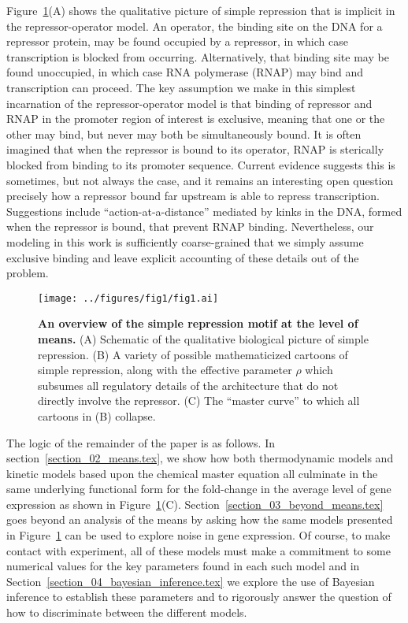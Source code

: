 Figure~\ref{fig1:means_cartoons}(A) shows the qualitative picture of simple repression that
is implicit in the repressor-operator model.
An operator, the binding site on the DNA for a repressor protein, may be found
occupied by a repressor, in which case transcription is blocked from occurring.
Alternatively, that binding site may be found unoccupied, in which case RNA polymerase (RNAP) may bind and
transcription can proceed.
The key assumption we make in this simplest incarnation of
the repressor-operator model is that binding of repressor and RNAP in the promoter
region of interest is exclusive, meaning that one or the other may bind, but
never may both be simultaneously bound. It is often imagined that when the
repressor is bound to its operator, RNAP is sterically blocked from binding to
its promoter sequence. Current evidence suggests this is sometimes, but not
always the case, and it remains
an interesting open question precisely how a repressor bound far upstream is
able to repress transcription. 
Suggestions include ``action-at-a-distance''
mediated by kinks in the DNA, formed when the repressor is bound, that prevent
RNAP binding. Nevertheless, our modeling in this work is sufficiently
coarse-grained that we simply assume exclusive binding and leave explicit accounting
of these details out of the problem.

\begin{figure}%
\centering
\texttt{[image: ../figures/fig1/fig1.ai]}
\caption{\textbf{An overview of the simple repression motif at the level of
means.} (A) Schematic of the qualitative biological picture of simple repression. (B)
A variety of possible mathematicized cartoons of simple repression, along
with the effective parameter $\rho$ which subsumes all regulatory details of the
architecture that do not directly involve the repressor. (C) The ``master curve'' to which
all cartoons in (B) collapse.}
\label{fig1:means_cartoons}
\end{figure}

The logic of the remainder of the paper is as follows.
In section~\ref{section_02_means.tex}, we show how
both thermodynamic models and kinetic models based upon
the chemical master equation all culminate in the same underlying
functional form for the fold-change in the average level of gene
expression as shown in Figure~\ref{fig1:means_cartoons}(C).  Section~\ref{section_03_beyond_means.tex} goes
beyond an analysis of the means by asking how the same models
presented in Figure~\ref{fig1:means_cartoons} can be used
to explore noise in gene expression. Of course, to make contact
with experiment, all of these models must make a commitment
to some numerical values for the key parameters found in each
such model and in Section~\ref{section_04_bayesian_inference.tex}
we explore the use of Bayesian inference to establish
these parameters and to rigorously answer the question of how
to discriminate between the different models.


